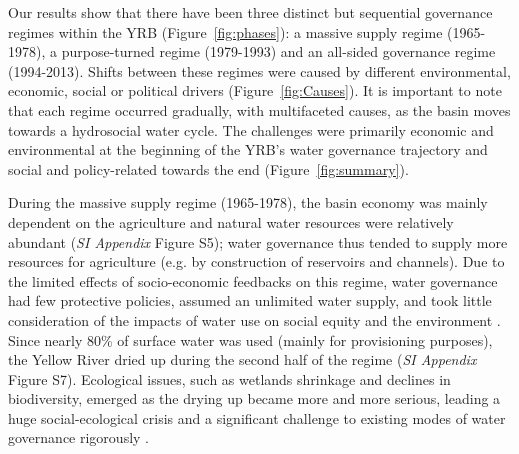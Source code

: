 \documentclass[9pt, twocolumn, twoside, lineno]{pnas-new}
\begin{document}
Our results show that there have been three distinct but sequential governance regimes within the YRB (Figure~\ref{fig:phases}): a massive supply regime (1965-1978), a purpose-turned regime (1979-1993) and an all-sided governance regime (1994-2013). Shifts between these regimes were caused by different environmental, economic, social or political drivers (Figure~\ref{fig:Causes}).
It is important to note that each regime occurred gradually, with multifaceted causes, as the basin moves towards a hydrosocial water cycle.
The challenges were primarily economic and environmental at the beginning of the YRB's water governance trajectory and social and policy-related towards the end (Figure~\ref{fig:summary}).

During the massive supply regime (1965-1978), the basin economy was mainly dependent on the agriculture and natural water resources were relatively abundant (\textit{SI Appendix} Figure S5); water governance thus tended to supply more resources for agriculture (e.g. by construction of reservoirs and channels). 
Due to the limited effects of socio-economic feedbacks on this regime, water governance had few protective policies, assumed an unlimited water supply, and took little consideration of the impacts of water use on social equity and the environment 
\cite{zhou2020}. 
Since nearly 80\% of surface water was used (mainly for provisioning purposes), the Yellow River dried up during the second half of the regime (\textit{SI Appendix} Figure S7). 
Ecological issues, such as wetlands shrinkage and declines in biodiversity, emerged as the drying up became more and more serious, leading a huge social-ecological crisis and a significant challenge to existing modes of water governance rigorously 
\cite{wohlfart2016}.
\end{document}
